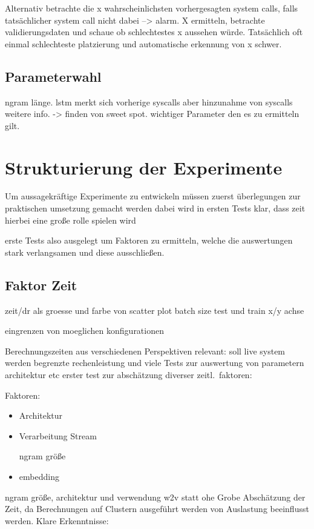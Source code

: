             Alternativ betrachte die x wahrscheinlichsten vorhergesagten system calls, falls tatsächlicher system call nicht dabei --> alarm.
            X ermitteln, betrachte validierungsdaten und schaue ob schlechtestes x aussehen würde.
            Tatsächlich oft einmal schlechteste platzierung und automatische erkennung von x schwer.

        \subsection{Parameterwahl}\label{sec:parameterwahl}
            ngram länge.
            lstm merkt sich vorherige syscalls aber hinzunahme von syscalls weitere info.
            -> finden von sweet spot.
            wichtiger Parameter den es zu ermitteln gilt.

    \section{Strukturierung der Experimente}\label{sec:StrukExp}
        Um aussagekräftige Experimente zu entwickeln müssen zuerst 
        überlegungen zur praktischen umsetzung gemacht werden
        dabei wird in ersten Tests klar, dass zeit hierbei eine große rolle spielen wird

        erste Tests also ausgelegt um Faktoren zu ermitteln, welche die auswertungen stark verlangsamen
        und diese ausschließen.

        \subsection{Faktor Zeit}

            zeit/dr als groesse und farbe von scatter plot
            batch size test und train x/y achse

            eingrenzen von moeglichen konfigurationen

            Berechnungszeiten aus verschiedenen Perspektiven relevant:
            soll live system werden
            begrenzte rechenleistung und viele Tests zur auswertung von parametern architektur etc
            erster test zur abschätzung diverser zeitl.\ faktoren:

            Faktoren:
            \begin{itemize}
                \item Architektur
                \item Verarbeitung Stream

                     ngram größe
                \item embedding
            \end{itemize}
        ngram größe, architektur und verwendung w2v statt ohe
        Grobe Abschätzung der Zeit, da Berechnungen auf Clustern ausgeführt werden von Auslastung beeinflusst werden.
        Klare Erkenntnisse:

